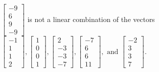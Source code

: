 \begin{exercise}
\begin{exerciseStatement}
  \end{exerciseStatement}
  \begin{exerciseAnswer}
   \(\left[\begin{array}{c}
-9 \\
6 \\
9 \\
-9
\end{array}\right]\) 
  	 is not  
	a linear combination of the vectors \(\left[\begin{array}{c}
-1 \\
1 \\
1 \\
2
\end{array}\right] , \left[\begin{array}{c}
1 \\
0 \\
0 \\
1
\end{array}\right] , \left[\begin{array}{c}
2 \\
-3 \\
-3 \\
-7
\end{array}\right] , \left[\begin{array}{c}
-7 \\
6 \\
6 \\
11
\end{array}\right] , \text{ and } \left[\begin{array}{c}
-2 \\
3 \\
3 \\
7
\end{array}\right]\).

	
  


  \end{exerciseAnswer}
\end{exercise}